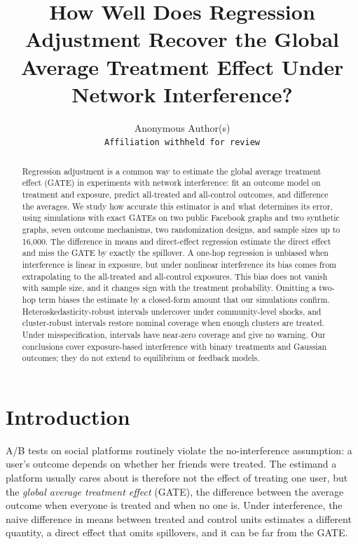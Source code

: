\documentclass{article}
\title{How Well Does Regression Adjustment Recover the Global Average Treatment Effect Under Network Interference?}
\author{%
  Anonymous Author(s)\\
  \texttt{Affiliation withheld for review}\\
}
\begin{document}
\maketitle

\begin{abstract}
Regression adjustment is a common way to estimate the global average treatment effect (GATE) in experiments with network interference: fit an outcome model on treatment and exposure, predict all-treated and all-control outcomes, and difference the averages. We study how accurate this estimator is and what determines its error, using simulations with exact GATEs on two public Facebook graphs and two synthetic graphs, seven outcome mechanisms, two randomization designs, and sample sizes up to 16{,}000. The difference in means and direct-effect regression estimate the direct effect and miss the GATE by exactly the spillover. A one-hop regression is unbiased when interference is linear in exposure, but under nonlinear interference its bias comes from extrapolating to the all-treated and all-control exposures. This bias does not vanish with sample size, and it changes sign with the treatment probability. Omitting a two-hop term biases the estimate by a closed-form amount that our simulations confirm. Heteroskedasticity-robust intervals undercover under community-level shocks, and cluster-robust intervals restore nominal coverage when enough clusters are treated. Under misspecification, intervals have near-zero coverage and give no warning. Our conclusions cover exposure-based interference with binary treatments and Gaussian outcomes; they do not extend to equilibrium or feedback models.
\end{abstract}

\section{Introduction}
A/B tests on social platforms routinely violate the no-interference assumption: a user's outcome depends on whether her friends were treated. The estimand a platform usually cares about is therefore not the effect of treating one user, but the \emph{global average treatment effect} (GATE), the difference between the average outcome when everyone is treated and when no one is. Under interference, the naive difference in means between treated and control units estimates a different quantity, a direct effect that omits spillovers, and it can be far from the GATE.
\end{document}
